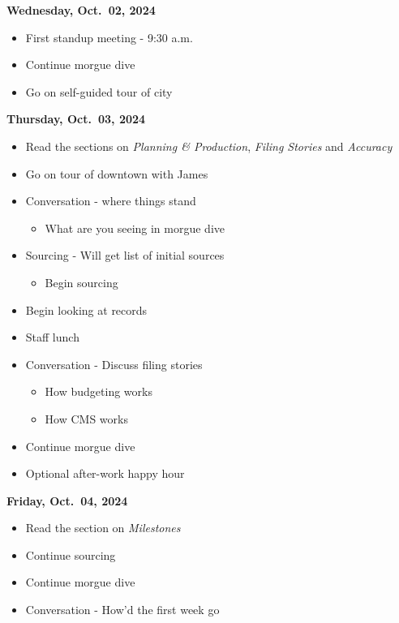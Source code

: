 \documentclass[
  11pt,
  american,
  letterpaperpaper,
  extrafontsizes,onecolumn,openright
  ]{memoir}
\providecommand{\tightlist}{%
  \setlength{\itemsep}{0pt}\setlength{\parskip}{0pt}}
\begin{document}
\textbf{Wednesday, Oct.~02, 2024}

\begin{itemize}
\tightlist
\item
  First standup meeting - 9:30 a.m.
\item
  Continue morgue dive
\item
  Go on self-guided tour of city
\end{itemize}

\textbf{Thursday, Oct.~03, 2024}

\begin{itemize}
\tightlist
\item
  Read the sections on \emph{Planning \& Production}, \emph{Filing Stories} and \emph{Accuracy}
\item
  Go on tour of downtown with James
\item
  Conversation - where things stand

  \begin{itemize}
  \tightlist
  \item
    What are you seeing in morgue dive
  \end{itemize}
\item
  Sourcing - Will get list of initial sources

  \begin{itemize}
  \tightlist
  \item
    Begin sourcing
  \end{itemize}
\item
  Begin looking at records
\item
  Staff lunch
\item
  Conversation - Discuss filing stories

  \begin{itemize}
  \tightlist
  \item
    How budgeting works
  \item
    How CMS works
  \end{itemize}
\item
  Continue morgue dive
\item
  Optional after-work happy hour
\end{itemize}

\newpage

\textbf{Friday, Oct.~04, 2024}

\begin{itemize}
\tightlist
\item
  Read the section on \emph{Milestones}
\item
  Continue sourcing
\item
  Continue morgue dive
\item
  Conversation - How'd the first week go
\end{itemize}
\end{document}
